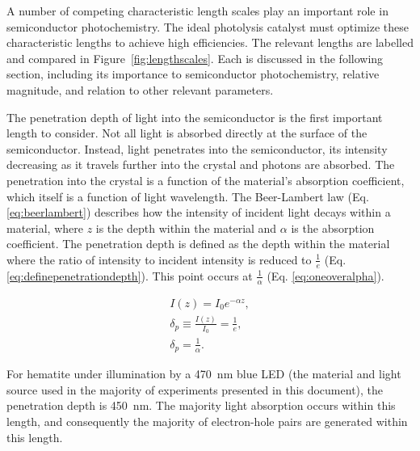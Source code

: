 \documentclass[12pt,%
              twoside,
               letterpaper]{uiothesis}
\begin{document}
A number of competing characteristic length scales play an important role in semiconductor
photochemistry. The ideal photolysis catalyst must optimize these characteristic lengths
to achieve high efficiencies. The relevant lengths are labelled and compared in
Figure~\ref{fig:lengthscales}. Each is discussed in the following section, including its
importance to semiconductor photochemistry, relative magnitude, and relation to other
relevant parameters.

The penetration depth of light into the semiconductor is the first important length to
consider. Not all light is absorbed directly at the surface of the semiconductor. Instead,
light penetrates into the semiconductor, its intensity decreasing as it travels further
into the crystal and photons are absorbed. The penetration into the crystal is a function
of the material's absorption coefficient, which itself is a function of light wavelength.
The Beer-Lambert law (Eq. \ref{eq:beerlambert}) describes how the intensity of incident
light decays within a material, where $z$ is the depth within the material and $\alpha$ is
the absorption coefficient. The penetration depth is defined as the depth within the
material where the ratio of intensity to incident intensity is reduced to  $\frac{1}{e}$
(Eq. \ref{eq:definepenetrationdepth}). This point occurs at $\frac{1}{\alpha}$ (Eq.
\ref{eq:oneoveralpha}).

\begin{gather}
	\label{eq:beerlambert}
	I(z)=I_{0}e^{-\alpha z},\\
	\label{eq:definepenetrationdepth}
	\delta_{p} \equiv \frac{I(z)}{I_{0}}=\frac{1}{e},\\
	\label{eq:oneoveralpha}
	\delta_{p} = \frac{1}{\alpha}.
\end{gather}

For hematite under illumination by a \SI{470}{\nano\meter} blue LED (the material and
light source used in the majority of experiments presented in this document), the
penetration depth is \texttildelow\SI{450}{\nano\meter}.\cite{Marusak:1980gc} The majority
light absorption occurs within this length, and consequently the majority of electron-hole
pairs are generated within this length.
\end{document}
